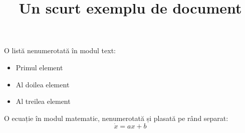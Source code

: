\documentclass{article}
\title{Un scurt exemplu de document}
\begin{document}
\maketitle
O listă nenumerotată în modul text:
\begin{itemize}
\item Primul element
\item Al doilea element
\item Al treilea element
\end{itemize}
		
O ecuație în modul matematic, nenumerotată și plasată pe rând separat:
$$ \dot{x}=ax+b $$
\end{document}
